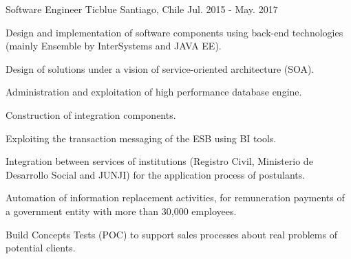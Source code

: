 \begin{cventries}
  \cventry
    {Software Engineer} %
    {Ticblue} %
    {Santiago, Chile} %
    {Jul. 2015 - May. 2017} %
    {
      \begin{cvitems} %
        \item {Design and implementation of software components using back-end technologies (mainly Ensemble by InterSystems and JAVA EE).}
        \item {Design of solutions under a vision of service-oriented architecture (SOA).}
        \item {Administration and exploitation of high performance database engine.}
        \item {Construction of integration components.}
        \item {Exploiting the transaction messaging of the ESB using BI tools.}
        \item {Integration between services of institutions (Registro Civil, Ministerio de Desarrollo Social and JUNJI) for the application process of postulants.}
        \item {Automation of information replacement activities, for remuneration payments of a government entity with more than 30,000 employees.}
        \item {Build Concepts Tests (POC) to support sales processes about real problems of potential clients.}
      \end{cvitems}
    }

\end{cventries}
